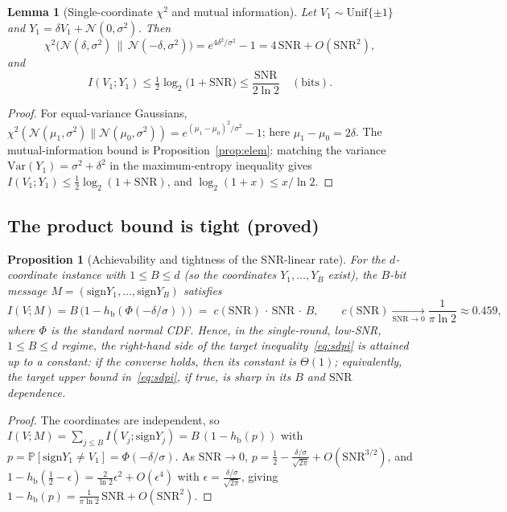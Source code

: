 \documentclass[11pt]{article}
\newtheorem{lemma}{Lemma}
\newtheorem{proposition}{Proposition}
\theoremstyle{definition}
\newcommand{\Prob}{\mathbb{P}}
\newcommand{\Unif}{\mathrm{Unif}}
\newcommand{\sign}{\mathrm{sign}}
\newcommand{\hb}{h_{\mathrm{b}}}
\newcommand{\Ncal}{\mathcal{N}}
\begin{document}
\begin{lemma}[Single-coordinate $\chi^2$ and mutual information]
\label{lem:single}
Let $V_1\sim\Unif\{\pm1\}$ and $Y_1=\delta V_1+\Ncal(0,\sigma^2)$. Then
\[
  \chi^2\!\big(\Ncal(\delta,\sigma^2)\,\big\|\,\Ncal(-\delta,\sigma^2)\big)=e^{4\delta^2/\sigma^2}-1
  =4\,\mathrm{SNR}+O(\mathrm{SNR}^2),
\]
and
\[
  I(V_1;Y_1)\le\tfrac12\log_2\!\big(1+\mathrm{SNR}\big)\le\frac{\mathrm{SNR}}{2\ln2}\quad(\text{bits}).
\]
\end{lemma}

\begin{proof}
For equal-variance Gaussians, $\chi^2(\Ncal(\mu_1,\sigma^2)\|\Ncal(\mu_0,\sigma^2))=e^{(\mu_1-\mu_0)^2/\sigma^2}-1$;
here $\mu_1-\mu_0=2\delta$. The mutual-information bound is Proposition~\ref{prop:elem}: matching the
variance $\mathrm{Var}(Y_1)=\sigma^2+\delta^2$ in the maximum-entropy inequality gives
$I(V_1;Y_1)\le\tfrac12\log_2(1+\mathrm{SNR})$, and $\log_2(1+x)\le x/\ln2$.
\end{proof}

\subsection{The product bound is tight (proved)}\label{app:d:2}

\begin{proposition}[Achievability and tightness of the SNR-linear rate]
\label{prop:tight}
For the $d$-coordinate instance with $1\le B\le d$ (so the coordinates $Y_1,\dots,Y_B$ exist), the
$B$-bit message $M=(\sign Y_1,\dots,\sign Y_B)$ satisfies
\[
  I(V;M)=B\,\big(1-\hb(\Phi(-\delta/\sigma))\big)\;=\;c(\mathrm{SNR})\,\cdot\,\mathrm{SNR}\,\cdot\,B,
  \qquad c(\mathrm{SNR})\xrightarrow[\mathrm{SNR}\to0]{}\frac{1}{\pi\ln2}\approx0.459,
\]
where $\Phi$ is the standard normal CDF. Hence, in the single-round, low-SNR, $1\le B\le d$ regime, the
right-hand side of the target inequality~\eqref{eq:sdpi} is attained up to a constant: \emph{if} the converse holds,
then its constant is $\Theta(1)$; equivalently, the target upper bound in~\eqref{eq:sdpi},
if true, is sharp in its $B$ and $\mathrm{SNR}$ dependence.
\end{proposition}

\begin{proof}
The coordinates are independent, so $I(V;M)=\sum_{j\le B}I(V_j;\sign Y_j)=B\,(1-\hb(p))$ with
$p=\Prob[\sign Y_1\neq V_1]=\Phi(-\delta/\sigma)$. As $\mathrm{SNR}\to0$, $p=\tfrac12-\tfrac{\delta/\sigma}{\sqrt{2\pi}}+O(\mathrm{SNR}^{3/2})$,
and $1-\hb(\tfrac12-\epsilon)=\tfrac{2}{\ln2}\epsilon^2+O(\epsilon^4)$ with $\epsilon=\tfrac{\delta/\sigma}{\sqrt{2\pi}}$,
giving $1-\hb(p)=\tfrac{1}{\pi\ln2}\,\mathrm{SNR}+O(\mathrm{SNR}^2)$.
\end{proof}
\end{document}
